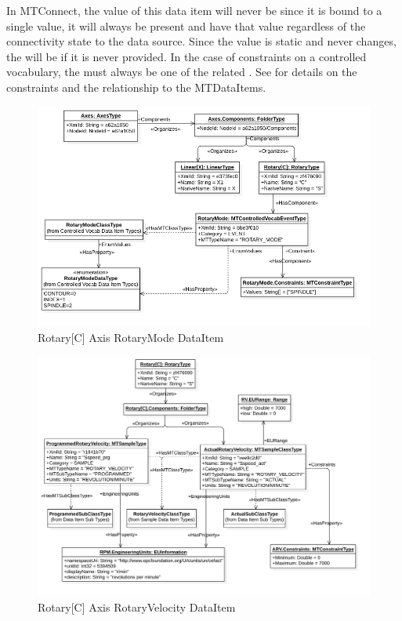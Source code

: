 In MTConnect, the value of this data item will never be  since it is bound to a single value, it will always be present and have that value regardless of the connectivity state to the data source. Since the value is static and never changes, the  will be  if it is never provided. In the case of constraints on a controlled vocabulary, the  must always be one of the related . See \cite{MTCPart2} for details on the constraints and the relationship to the \glspl{MTDataItem}.

\begin{figure}[ht]
  \centering
  \includegraphics[width=1.0\textwidth]{diagrams/mtconnect-mapping/rotary-c-rotary-mode.png}
  \caption{Rotary[C] Axis RotaryMode DataItem}
  \label{fig:rotary-c-rotary-mode}
\end{figure}

\FloatBarrier

\begin{figure}[ht]
  \centering
  \includegraphics[width=1.0\textwidth]{diagrams/mtconnect-mapping/rotary-c-rotary-velocity.png}
  \caption{Rotary[C] Axis RotaryVelocity DataItem}
  \label{fig:rotary-c-rotary-velocity}
\end{figure}

